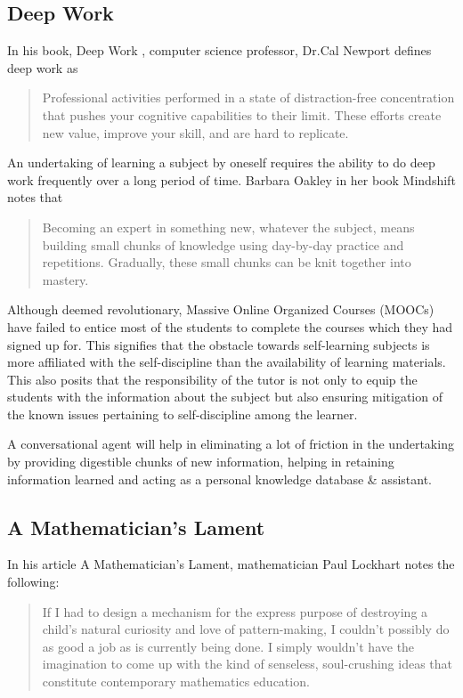 \documentclass[]{article}
\begin{document}
\subsection{Deep Work}
In his book, Deep Work \cite{newport2016deep}, computer science professor, Dr.Cal Newport defines deep work as
\begin{quote}
  Professional activities performed in a state of distraction-free concentration that pushes your cognitive capabilities to their limit. These efforts create new value, improve your skill, and are hard to replicate.
  \end{quote}

An undertaking of learning a subject by oneself requires the ability to do deep work frequently over a long period of time. Barbara Oakley in her book Mindshift\cite{oakley2017mindshift} notes that
\begin{quote}
  Becoming an expert in something new, whatever the subject, means building small chunks of knowledge using day-by-day practice and repetitions. Gradually, these small chunks can be knit together into mastery.
\end{quote}



Although deemed revolutionary, Massive Online Organized Courses (MOOCs) have failed to entice most of the students to complete the courses which they had signed up for. This signifies that the obstacle towards self-learning subjects is more affiliated with the self-discipline than the availability of learning materials. This also posits that the responsibility of the tutor is not only to equip the students with the information about the subject but also ensuring mitigation of the known issues pertaining to self-discipline among the learner. 

A conversational agent will help in eliminating a lot of friction in the undertaking by providing digestible chunks of new information, helping in retaining information learned and acting as a personal knowledge database \& assistant.

\subsection[Lockhart's Lament]{A Mathematician's Lament}
In his article A Mathematician's Lament\cite{lockhart2009mathematician}, mathematician Paul Lockhart notes the following: 

\begin{quote}
  If I had to design a mechanism for the express purpose of destroying a child's natural curiosity and love of pattern-making, I couldn't possibly do as good a job as is currently being done. I simply wouldn't have the imagination to come up with the kind of senseless, soul-crushing ideas that constitute contemporary mathematics education.
\end{quote}
\end{document}
